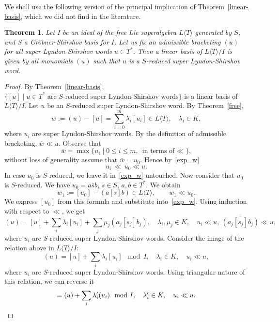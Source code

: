 \documentclass[12pt, reqno]{amsart}
\newtheorem{theorem}{Theorem}[section]
\theoremstyle{remark}
\theoremstyle{definition}
\numberwithin{equation}{section}
\begin{document}
We shall use the following version of the principal implication of Theorem~\ref{linear-basis},
which we did not find in the literature.

\begin{theorem}\label{linear-basis2}
Let $I$ be an ideal of the free Lie superalgebra $L\langle T\rangle$ generated by $S$, and $S$ a Gr\"obner-Shirshov basis for $I$.
Let us fix an admissible bracketing $(u)$ for all super Lyndon-Shirshov words $u\in T^*$.
Then a linear basis of $L\langle T\rangle/I$ is given by all monomials $(u)$ such that $u$ is a $S$-reduced super Lyndon-Shirshov word. 
\end{theorem}

\begin{proof}
By Theorem~\ref{linear-basis}, $\{[u]\mid u\in T^* \text{ are $S$-reduced super Lyndon-Shirshov words} \}$ is a linear basis of $L\langle T\rangle/I$.
Let $u$ be an $S$-reduced super Lyndon-Shirshov word. By Theorem~\ref{free},
\begin{equation}\label{exp_w}
w:=(u)-[u]=\sum_{i=0}^m \lambda_i [u_i] \in L\langle T\rangle, \quad \lambda_i\in K,
\end{equation}
where $u_i$ are super Lyndon-Shirshov words.
By the definition of admissible bracketing, $\overline {w}\ll  u.$
Observe that $$\overline w=\max\{u_i\mid 0\le i\le m,\ \text{in terms of $\ll $}\},$$ without loss of generality assume that $\overline{w}=u_0$. 
Hence  by~\eqref{exp_w}  $$u_i\,\underline {\ll }\, u_0\ll  u.$$
In case $u_0$ is $S$-reduced, we leave it in~\eqref{exp_w} untouched.
Now consider that $u_0$ is $S$-reduced. We have  $u_0=a\bar{s}b$, $s\in S$, $a,b\in T^*$. 
We obtain
$$
w_1:=[u_0]-  (a[s]b) \in L\langle T\rangle,\qquad \overline{w_1}\ll  u_0.   
$$
We express $[u_0]$ from this formula and substitute into~\eqref{exp_w}.
Using induction with respect to $\ll $, we get
\begin{equation}\label{uus}
(u)=[u]+\sum_i\lambda_i [u_i]+\sum _j\mu_j   (a_j [s_j] b_j), \quad \lambda_i,\mu_j\in K,\quad u_i\ll u,\    \overline{(a_j [s_j] b_j)}    \ll  u,    
\end{equation}
where $u_i$ are $S$-reduced super Lyndon-Shirshov words. Consider the image of the relation above in $L\langle T\rangle/I$:
\begin{equation*}
(u)=[u]+\sum_i\lambda_i [u_i] \mod I, \quad \lambda_i\in K,\quad u_i\ll u,    
\end{equation*}
where $u_i$ are $S$-reduced super Lyndon-Shirshov words. Using triangular nature of this relation, we can reverse it
\begin{equation*}
[u]=(u)+\sum_i\lambda_i' (u_i)\mod I, \quad \lambda_i'\in K,\quad u_i\ll u. \qedhere    
\end{equation*}
\end{proof}
\end{document}
